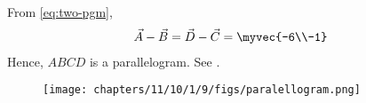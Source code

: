 	  From \eqref{eq:two-pgm},
\begin{align}
\vec{A}-\vec{B} = 
\vec{D}-\vec{C} =  \myvec{-6\\-1}
\end{align}
Hence, $ABCD$ is a parallelogram.
See .
\begin{figure}[H]
  \centering
   \texttt{[image: chapters/11/10/1/9/figs/paralellogram.png]}
    \caption{}
     \label{fig:chapters/11/10/1/91}  
\end{figure}



